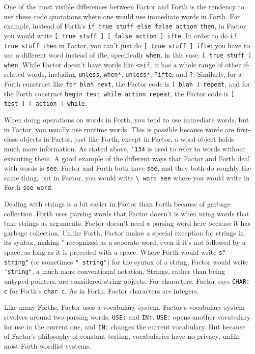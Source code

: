 \documentclass{article}
\begin{document}
One of the most visible differences between Factor and Forth is the tendency to use these code quotations where one would use immediate words in Forth. For example, instead of Forth's \verb|if true stuff else false action then|, in Factor you would write \verb|[ true stuff ] [ false action ] ifte|. In order to do \verb|if true stuff then| in Factor, you can't just do \verb|[ true stuff ] ifte|; you have to use a different word instead of ifte, specifically \texttt{when}, in this case: \verb|[ true stuff ] when|. While Factor doesn't have words like \texttt{<>if}, it has a whole range of other if-related words, including \texttt{unless}, \texttt{when*}, \texttt{unless*}, \texttt{?ifte}, and \texttt{?}. Similarly, for a Forth construct like \verb|for blah next|, the Factor code is \verb|[ blah ] repeat|, and for the Forth construct \verb|begin test while action repeat|, the Factor code is \verb|[ test ] [ action ] while|.

When doing operations on words in Forth, you tend to use immediate words, but in Factor, you usually use runtime words. This is possible because words are first-class objects in Factor, just like Forth, except in Factor, a word object holds much more information. As stated above, \texttt{\char'134} is used to refer to words without executing them. A good example of the different ways that Factor and Forth deal with words is \texttt{see}. Factor and Forth both have \texttt{see}, and they both do roughly the same thing, but in Factor, you would write \verb|\ word see| where you would write in Forth \verb|see word|.

Dealing with strings is a bit easier in Factor than Forth because of garbage collection. Forth uses parsing words that Factor doesn't is when using words that take strings as arguments. Factor doesn't need a parsing word here because it has garbage collection. Unlike Forth, Factor makes a special exception for strings in its syntax, making " recognized as a seperate word, even if it's not followed by a space, as long as it is preceded with a space. Where Forth would write \verb|s" string"| (or sometimes \verb|" string"|) for the syntax of a string, Factor would write \verb|"string"|, a much more conventional notation. Strings, rather than being untyped pointers, are considered string objects. For characters, Factor says \verb|CHAR: c| for Forth's \verb|char c|. As in Forth, Factor characters are integers.

Like many Forths, Factor uses a vocabulary system. Factor's vocabulary system revolves around two parsing words, \texttt{USE:} and \texttt{IN:}. \texttt{USE:} opens another vocabulary for use in the current one, and \texttt{IN:} changes the current vocabulary. But because of Factor's philosophy of constant testing, vocabularies have no privacy, unlike most Forth wordlist systems. 
\end{document}
